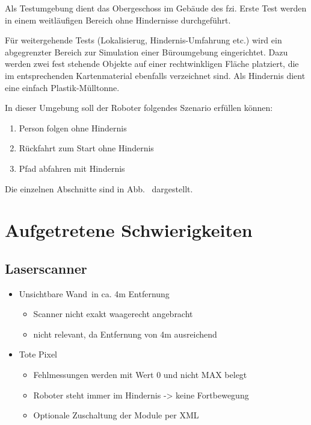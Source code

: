 Als Testumgebung dient das Obergeschoss im Gebäude des \gls{fzi}.
Erste Test werden in einem weitläufigen Bereich ohne Hindernisse durchgeführt.

Für weitergehende Tests (Lokalisierug, Hindernis-Umfahrung etc.) wird ein abgegrenzter Bereich zur Simulation einer Büroumgebung eingerichtet.
Dazu werden zwei fest stehende Objekte auf einer rechtwinkligen Fläche platziert, die im entsprechenden Kartenmaterial ebenfalls verzeichnet sind.
Als Hindernis dient eine einfach Plastik-Mülltonne.

In dieser Umgebung soll der Roboter folgendes Szenario erfüllen können:
\begin{enumerate}
  \item Person folgen ohne Hindernis
  \item Rückfahrt zum Start ohne Hindernis
  \item Pfad abfahren mit Hindernis
\end{enumerate}
Die einzelnen Abschnitte sind in Abb. \ dargestellt.




\section{Aufgetretene Schwierigkeiten}
\authorsection{\editorjulian}

\subsection{Laserscanner}

\begin{itemize}
	\item \glqq Unsichtbare Wand\grqq\ in ca. 4m Entfernung
	\begin{itemize}
		\item Scanner nicht exakt waagerecht angebracht
		\item nicht relevant, da Entfernung von 4m ausreichend
	\end{itemize}
	\item \glqq Tote Pixel\grqq
	\begin{itemize}
		\item Fehlmessungen werden mit Wert 0 und nicht MAX belegt
		\item Roboter steht immer im Hindernis -> keine Fortbewegung
		\item Optionale Zuschaltung der Module per XML
	\end{itemize}
\end{itemize}


